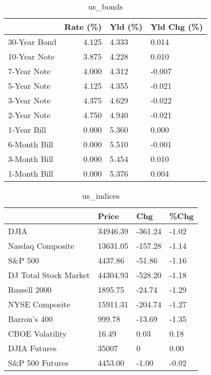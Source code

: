 \documentclass{article}%
\begin{document}
%


\begin{table}[htbp]%
\caption{us\_bonds}%
\centering%
\begin{adjustbox}{width=1\textwidth}%
\begin{tabular}{lrll}
\toprule
             &  Rate (\%) & Yld (\%) & Yld Chg (\%) \\
\midrule
30-Year Bond &     4.125 &   4.333 &       0.014 \\
10-Year Note &     3.875 &   4.228 &       0.010 \\
 7-Year Note &     4.000 &   4.312 &      -0.007 \\
 5-Year Note &     4.125 &   4.355 &      -0.021 \\
 3-Year Note &     4.375 &   4.629 &      -0.022 \\
 2-Year Note &     4.750 &   4.940 &      -0.021 \\
 1-Year Bill &     0.000 &   5.360 &       0.000 \\
6-Month Bill &     0.000 &   5.510 &      -0.001 \\
3-Month Bill &     0.000 &   5.454 &       0.010 \\
1-Month Bill &     0.000 &   5.376 &       0.004 \\
\bottomrule
\end{tabular}
%
\end{adjustbox}%
\end{table}

%


\begin{table}[htbp]%
\caption{us\_indices}%
\centering%
\begin{adjustbox}{width=1\textwidth}%
\begin{tabular}{llll}
\toprule
                      &    Price &     Chg &  \%Chg \\
\midrule
                 DJIA & 34946.39 & -361.24 & -1.02 \\
     Nasdaq Composite & 13631.05 & -157.28 & -1.14 \\
              S\&P 500 &  4437.86 &  -51.86 & -1.16 \\
DJ Total Stock Market & 44304.93 & -528.20 & -1.18 \\
         Russell 2000 &  1895.75 &  -24.74 & -1.29 \\
       NYSE Composite & 15911.31 & -204.74 & -1.27 \\
         Barron's 400 &   999.78 &  -13.69 & -1.35 \\
      CBOE Volatility &    16.49 &    0.03 &  0.18 \\
         DJIA Futures &    35007 &       0 &  0.00 \\
      S\&P 500 Futures &  4453.00 &   -1.00 & -0.02 \\
\bottomrule
\end{tabular}
%
\end{adjustbox}%
\end{table}
\end{document}
